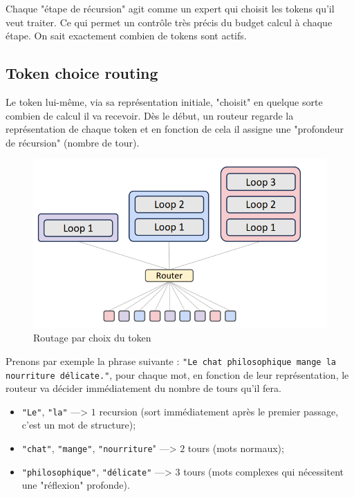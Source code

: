 \documentclass[a4paper]{article}
\begin{document}
Chaque "étape de récursion" agit comme un expert qui choisit les tokens
qu'il veut traiter. Ce qui permet un contrôle très précis du budget calcul
à chaque étape. On sait exactement combien de tokens sont actifs.

\subsection{Token choice routing}
Le token lui-même, via sa représentation initiale, "choisit" en quelque sorte
combien de calcul il va recevoir. Dès le début, un routeur regarde
la représentation de chaque token et en fonction de cela il assigne
une "profondeur de récursion" (nombre de tour).
 
 \begin{figure}[h]
  \centering
  \includegraphics[scale=0.5]{images/token_choice_routing.png}
  \caption{Routage par choix du token \cite{bae2025mixtureofrecursionslearningdynamicrecursive}}
  \label{fig:token-choice-routing}
\end{figure}
 
 Prenons par exemple la phrase suivante :
 \texttt{"Le chat philosophique mange la nourriture délicate."}, pour chaque
 mot, en fonction de leur représentation, le routeur va décider immédiatement
 du nombre de tours qu'il fera.
 
 \begin{itemize}
  \item \texttt{"Le"}, \texttt{"la"} ---> $1$ recursion
  (sort immédiatement après le premier passage, c'est un mot de structure);
  \item \texttt{"chat"}, \texttt{"mange"}, \texttt{"nourriture}" ---> $2$ tours
  (mots normaux);
  \item \texttt{"philosophique"}, \texttt{"délicate"} ---> $3$ tours
  (mots complexes qui nécessitent une "réflexion" profonde).
 \end{itemize}
\end{document}
